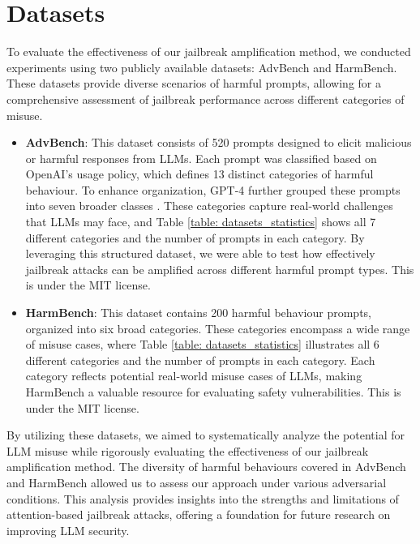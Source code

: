 \section{Datasets}
\label{appendix: dataset}

To evaluate the effectiveness of our jailbreak amplification method, we conducted experiments using two publicly available datasets: AdvBench and HarmBench. These datasets provide diverse scenarios of harmful prompts, allowing for a comprehensive assessment of jailbreak performance across different categories of misuse.

\begin{itemize}
    \item \textbf{AdvBench}: This dataset consists of 520 prompts designed to elicit malicious or harmful responses from LLMs. Each prompt was classified based on OpenAI’s usage policy, which defines 13 distinct categories of harmful behaviour. To enhance organization, GPT-4 further grouped these prompts into seven broader classes \cite{ding2023wolf}. These categories capture real-world challenges that LLMs may face, and Table \ref{table: datasets_statistics} shows all 7 different categories and the number of prompts in each category. By leveraging this structured dataset, we were able to test how effectively jailbreak attacks can be amplified across different harmful prompt types. This is under the MIT license.

    \item \textbf{HarmBench}: This dataset contains 200 harmful behaviour prompts, organized into six broad categories. These categories encompass a wide range of misuse cases, where Table \ref{table: datasets_statistics} illustrates all 6 different categories and the number of prompts in each category. Each category reflects potential real-world misuse cases of LLMs, making HarmBench a valuable resource for evaluating safety vulnerabilities. This is under the MIT license.
\end{itemize}

By utilizing these datasets, we aimed to systematically analyze the potential for LLM misuse while rigorously evaluating the effectiveness of our jailbreak amplification method. The diversity of harmful behaviours covered in AdvBench and HarmBench allowed us to assess our approach under various adversarial conditions. This analysis provides insights into the strengths and limitations of attention-based jailbreak attacks, offering a foundation for future research on improving LLM security.





